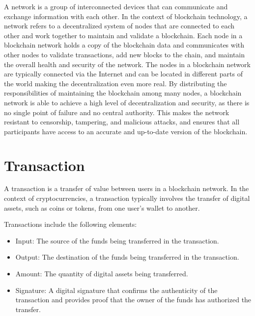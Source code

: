 \documentclass[target=mst,aauheader=]{thud}
\begin{document}
    A network is a group of interconnected devices that can communicate and exchange information with each other. In the context of blockchain technology, a network refers to a decentralized system of nodes that are connected to each other and work together to maintain and validate a blockchain. Each node in a blockchain network holds a copy of the blockchain data and communicates with other nodes to validate transactions, add new blocks to the chain, and maintain the overall health and security of the network. The nodes in a blockchain network are typically connected via the Internet and can be located in different parts of the world making the decentralization even more real. By distributing the responsibilities of maintaining the blockchain among many nodes, a blockchain network is able to achieve a high level of decentralization and security, as there is no single point of failure and no central authority. This makes the network resistant to censorship, tampering, and malicious attacks, and ensures that all participants have access to an accurate and up-to-date version of the blockchain.
    
    \section{Transaction}

    A transaction is a transfer of value between users in a blockchain network. In the context of cryptocurrencies, a transaction typically involves the transfer of digital assets, such as coins or tokens, from one user's wallet to another.
   
    Transactions include the following elements:

        \begin{itemize}    

            \item Input: The source of the funds being transferred in the transaction.
            \item Output: The destination of the funds being transferred in the transaction.
            \item Amount: The quantity of digital assets being transferred.
            \item  Signature: A digital signature that confirms the authenticity of the transaction and provides proof that the owner of the funds has authorized the transfer.

        \end{itemize}
    
\end{document}

